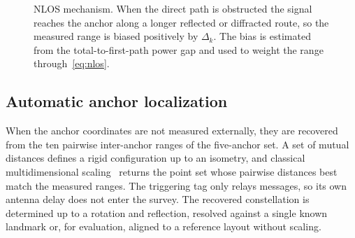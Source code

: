 \begin{figure}[t]
  \centering
  \caption{NLOS mechanism. When the direct path is obstructed the signal
  reaches the anchor along a longer reflected or diffracted route, so the
  measured range is biased positively by $\Delta_k$. The bias is
  estimated from the total-to-first-path power gap and used to weight the
  range through~\eqref{eq:nlos}.}
  \label{fig:nlos}
\end{figure}

\subsection{Automatic anchor localization}
When the anchor coordinates are not measured externally, they are
recovered from the ten pairwise inter-anchor ranges of the five-anchor
set. A set of mutual distances defines a rigid configuration up to an
isometry, and classical multidimensional scaling~\cite{torgerson1952mds}
returns the point set whose pairwise distances best match the measured
ranges. The triggering tag only relays messages, so its own antenna
delay does not enter the survey. The recovered constellation is
determined up to a rotation and reflection, resolved against a single
known landmark or, for evaluation, aligned to a reference layout without
scaling.
